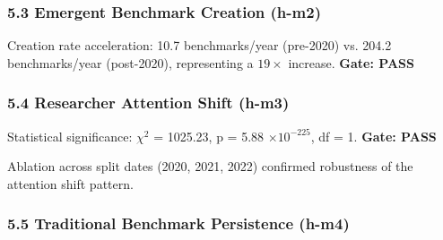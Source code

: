 \subsubsection{5.3 Emergent Benchmark Creation (h-m2)}

\begin{table}[htbp]
\centering
{}
\end{table}

Creation rate acceleration: 10.7 benchmarks/year (pre-2020) vs. 204.2 benchmarks/year (post-2020), representing a $19\times$ increase. \textbf{Gate: PASS}

\subsubsection{5.4 Researcher Attention Shift (h-m3)}

\begin{table}[htbp]
\centering
{}
\end{table}

Statistical significance: $\chi^2$ = 1025.23, p = 5.88 $\times 10^{-225}$, df = 1. \textbf{Gate: PASS}

Ablation across split dates (2020, 2021, 2022) confirmed robustness of the attention shift pattern.

\subsubsection{5.5 Traditional Benchmark Persistence (h-m4)}

